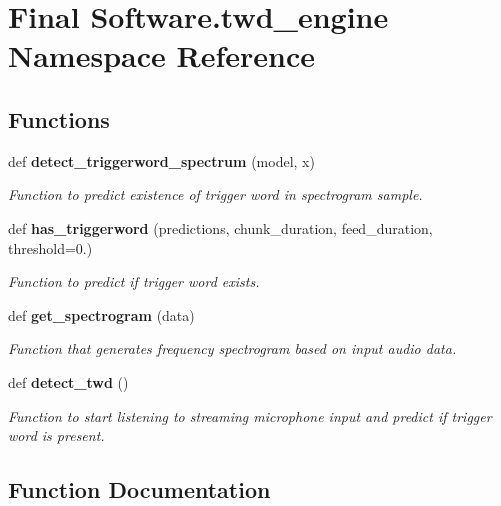 \section{Final Software.\+twd\+\_\+engine Namespace Reference}
\label{namespace_final_01_software_1_1twd__engine}
\subsection*{Functions}
\begin{DoxyCompactItemize}
\item 
def \textbf{ detect\+\_\+triggerword\+\_\+spectrum} (model, x)
\begin{DoxyCompactList}\small\item\em Function to predict existence of trigger word in spectrogram sample. \end{DoxyCompactList}\item 
def \textbf{ has\+\_\+triggerword} (predictions, chunk\+\_\+duration, feed\+\_\+duration, threshold=0.)
\begin{DoxyCompactList}\small\item\em Function to predict if trigger word exists. \end{DoxyCompactList}\item 
def \textbf{ get\+\_\+spectrogram} (data)
\begin{DoxyCompactList}\small\item\em Function that generates frequency spectrogram based on input audio data. \end{DoxyCompactList}\item 
def \textbf{ detect\+\_\+twd} ()
\begin{DoxyCompactList}\small\item\em Function to start listening to streaming microphone input and predict if trigger word is present. \end{DoxyCompactList}\end{DoxyCompactItemize}


\subsection{Function Documentation}
\mbox{\label{namespace_final_01_software_1_1twd__engine_aeaf5cb423d3cf627b18cbc074eb22348}} 
